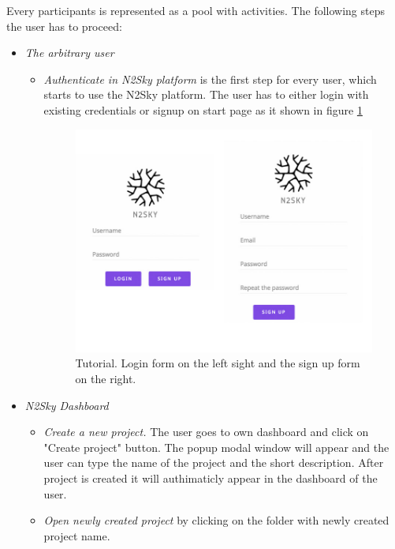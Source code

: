 Every participants is represented as a pool with activities. The following steps the user has to proceed:

\begin{itemize}
\item \emph{The arbitrary user} 
\begin{itemize}
\item \emph{Authenticate in N2Sky platform} is the first step for every user, which starts to use the N2Sky platform. 
The user has to either login with existing credentials or signup on start page as it shown in figure \ref{fig:sign_login}

\begin{figure}[htbp]
\begin{center}
  \includegraphics[width=\linewidth]{components/tutorial/img/sign_login.jpg}
  \caption{Tutorial. Login form on the left sight and the sign up form on the right.}
  \label{fig:sign_login}
\end{center}
\end{figure} 
\end{itemize}
\item \emph{N2Sky Dashboard} 
\begin{itemize}
\item \emph{Create a new project.} The user goes to own dashboard and click on "Create project" button. The popup modal window will appear and the user can type the name of the project and the short description. After project is created it will authimaticly appear in the dashboard of the user.  
\item \emph{Open newly created project} by clicking on the folder with newly created project name.

\end{itemize}
\end{itemize}
